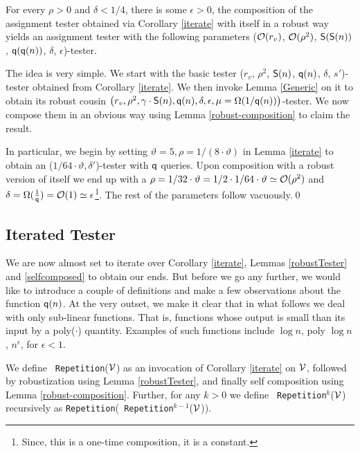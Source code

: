 \begin{lemma}\label{selfcomposed}
  For every $\rho > 0$ and $\delta < 1/4$, there is some $\epsilon > 0$,
  the composition of the assignment tester obtained via Corollary \ref{iterate} with
 itself in a robust way yields an assignment tester with the following 
parameters (${\cal O}(r_v)$, ${\cal O}(\rho^2)$, ${\sf S}({\sf S}(n))$, ${\sf q}({\sf q}(n))$, $\delta$, $\epsilon$)-tester.
\end{lemma}
 The idea is very simple. We start with the basic tester
($r_v$, $\rho^2$, ${\sf S}(n)$, ${\sf q}(n)$, $\delta$, $s'$)-tester obtained from Corollary \ref{iterate}. 
We then invoke Lemma \ref{Generic} on it to obtain its robust cousin 
$\left(r_v, \rho^2, \gamma \cdot {\sf S}(n), {\sf q}(n), \delta, \epsilon, \mu =
  \Omega(1/{\sf q}(n))\right)$-tester. We now compose them in an obvious 
way using Lemma \ref{robust-composition} to claim the result. 

In particular, we begin by setting $\vartheta = 5, \rho = 1/( 8 \cdot \vartheta)$ in Lemma \ref{iterate} to
obtain an ($1/64 \cdot \vartheta, \delta'$)-tester with ${\sf q}$ queries.
Upon composition with a robust version of itself we end up with a $\rho = 1/32
\cdot \vartheta = 1/2 \cdot 1/64 \cdot \vartheta \simeq {\cal O}(\rho^2)$
and $\delta = \Omega(\frac{1}{{\sf q}}) = {\cal O}(1) \simeq \epsilon$\footnote{Since, this is a
  one-time composition, it is a constant.}. The rest of
the parameters follow vacuously.\qed 

\subsection*{Iterated Tester}

We are now almost set to iterate over Corollary \ref{iterate}, Lemmas
\ref{robustTester} and \ref{selfcomposed} to obtain our ends. But
before we go any further, we would like to introduce a couple of
definitions and make a few observations about the function
${{\sf q}}(n)$. At the very outset, we make it clear that in what follows
we deal with only sub-linear functions. That is, functions whose
output is small than its input by a {\sf poly}($\cdot$)
quantity. Examples of such functions include $\log n$, {\sf poly}
$\log n$, $n^\epsilon$, for $\epsilon < 1$.

\begin{definition}[{\tt Repetition}] \label{repetition} We define {\tt
    Repetition}(${\cal V}$) as an invocation of Corollary \ref{iterate} on
  ${\cal V}$, followed by robustization using Lemma
  \ref{robustTester}, and finally self composition using Lemma
  \ref{robust-composition}. Further, for any $k > 0$ we define {\tt
    Repetition}$^{k}$(${\cal V}$) recursively as {\tt Repetition}({\tt
    Repetition}$^{k-1}$(${\cal V}$)).
\end{definition}


